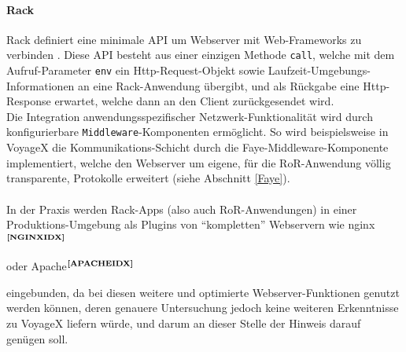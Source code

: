 \paragraph{Rack}\label{RACK}
Rack definiert eine minimale API um Webserver mit Web-Frameworks zu verbinden \cite{RACK:INTRO}.
Diese API besteht aus einer einzigen Methode \texttt{call}, welche mit dem Aufruf-Parameter \texttt{env} ein Http-Request-Objekt sowie Laufzeit-Umgebungs-Informationen an eine Rack-Anwendung übergibt, und als Rückgabe eine Http-Response erwartet, welche dann an den Client zurückgesendet wird.\\
Die Integration anwendungsspezifischer Netzwerk-Funktionalität wird durch konfigurierbare \texttt{Middleware}-Komponenten ermöglicht. So wird beispielsweise in VoyageX die Kommunikations-Schicht durch die Faye-Middleware-Komponente implementiert, welche den Webserver um eigene, für die RoR-Anwendung völlig transparente, Protokolle erweitert (siehe Abschnitt \ref{Faye}).\\ \\
In der Praxis werden Rack-Apps (also auch RoR-Anwendungen) in einer Produktions-Umgebung als Plugins von "`kompletten"' Webservern wie nginx$^{\textbf{\ref{NGINXIDX}}}$%
\addtocounter{footnote}{1}%
oder Apache$^{\textbf{\ref{APACHEIDX}}}$%
\addtocounter{footnote}{1}%
eingebunden, da bei diesen weitere und optimierte Webserver-Funktionen genutzt werden können, deren genauere Untersuchung jedoch keine weiteren Erkenntnisse zu VoyageX liefern würde, und darum an dieser Stelle der Hinweis darauf genügen soll.

